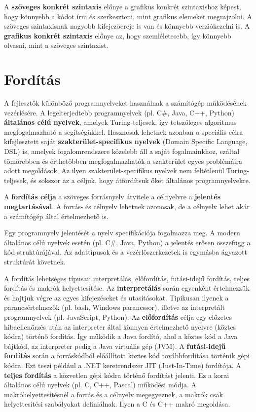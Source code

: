 \documentclass[12pt, a4paper]{report}
\newcommand{\bb}[1]{\textbf{#1}}
\begin{document}
A \bb{szöveges konkrét szintaxis} előnye a grafikus konkrét szintaxishoz képest, hogy könnyebb a kódot írni és szerkeszteni, mint grafikus elemeket megrajzolni. A szöveges szintaxisnak nagyobb kifejezőereje is van és könnyebb verziókezelni is. A \bb{grafikus konkrét szintaxis} előnye az, hogy szemléletesebb, így könnyebb olvasni, mint a szöveges szintaxist.

\chapter{Fordítás}

A fejlesztők különböző programnyelveket használnak a számítógép működésének vezérlésére. A legelterjedtebb programnyelvek (pl. C\#, Java, C++, Python) \bb{általános célú nyelvek}, amelyek Turing-teljesek, így tetszőleges algoritmus megfogalmazható a segítségükkel. Hasznosak lehetnek azonban a speciális célra kifejlesztett saját \bb{szakterület-specifikus nyelvek} (Domain Specific Language, DSL) is, amelyek fogalomrendszere közelebb áll a saját fogalmainkhoz, ezáltal tömörebben és érthetőbben megfogalmazhatók a szakterület egyes problémáira adott megoldások. Az ilyen szakterület-specifikus nyelvek nem feltétlenül Turing-teljesek, és sokszor az a céljuk, hogy átfordítsuk őket általános programnyelvekre.

A \bb{fordítás célja} a szöveges forrásnyelv átvitele a célnyelvre a \bb{jelentés megtartásával}. A forrás- és célnyelv lehetnek azonosak, de a célnyelv lehet akár a számítógép által értelmezhető is.

Egy programnyelv jelentését a nyelv specifikációja fogalmazza meg. A modern általános célú nyelvek esetén (pl. C\#, Java, Python) a jelentés erősen összefügg a kód struktúrájával. Az adattípusok és a vezérlőszerkezetek is egymásba ágyazott struktúrát követnek.

A fordítás lehetséges típusai: interpretálás, előfordítás, futási-idejű fordítás, teljes fordítás és makrók helyettesítése. Az \bb{interpretálás} során egyenként értelmezzük és hajtjuk végre az egyes kifejezéseket és utasításokat. Tipikusan ilyenek a parancsértelmezők (pl. bash, Windows parancssor), illetve az interpretált programnyelvek (pl. JavaScript, Python). Az \bb{előfordítás} célja egy előzetes hibaellenőrzés után az interpreter által könnyen értelmezhető nyelvre (köztes kódra) történő fordítás. Így működik a Java fordító, ahol a köztes kód a Java bájtkód, az interpreter pedig a Java virtuális gép (JVM). A \bb{futási-idejű fordítás} során a forráskódból előállított köztes kód továbbfordítása történik gépi kódra. Ezt teszi például a .NET keretrendszer JIT (Just-In-Time) fordítója. A \bb{teljes fordítás} a közvetlen gépi kódra történő fordítást jelenti. Ez a korai általános célú nyelvek (pl. C, C++, Pascal) működési módja. A makróhelyettesítésnél a forrás és a célnyelv megegyeznek, a makrók csak helyettesítési szabályokat definiálnak. Ilyen a C és C++ makró megoldása.
\end{document}
